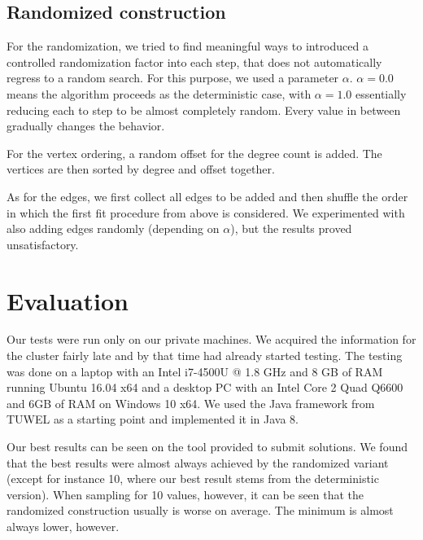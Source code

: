 \documentclass [11pt]{article}
\begin{document}
\subsection{Randomized construction}
For the randomization, we tried to find meaningful ways to introduced a controlled randomization factor into each step, that does not automatically regress to a random search. For this purpose, we used a parameter $\alpha$. $\alpha = 0.0$  means the algorithm proceeds as the deterministic case, with $\alpha = 1.0$ essentially reducing each to step to be almost completely random. Every value in between gradually changes the behavior. 

For the vertex ordering, a random offset for the degree count is added. The vertices are then sorted by degree and offset together. 

As for the edges, we first collect all edges to be added and then shuffle the order in which the first fit procedure from above is considered. We experimented with also adding edges randomly (depending on $\alpha$), but the results proved unsatisfactory. 

\section{Evaluation}
Our tests were run only on our private machines. We acquired the information for the cluster fairly late and by that time had already started testing. The testing was done on a laptop with an Intel i7-4500U @ 1.8 GHz and 8 GB of RAM running Ubuntu  16.04 x64  and a desktop PC with an Intel Core 2 Quad Q6600 and 6GB of RAM on Windows 10 x64. We used the Java framework from TUWEL as a starting point and implemented it in Java 8. 

Our best results can be seen on the tool provided to submit solutions. We found that the best results were almost always achieved by the randomized variant (except for instance 10, where our best result stems from the deterministic version). When sampling for 10 values, however, it can be seen that the randomized construction usually is worse on average. The minimum is almost always lower, however.
\end{document}
